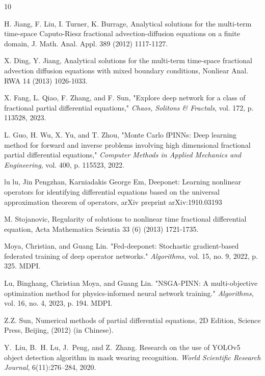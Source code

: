 \documentclass[11pt]{article}
\begin{document}
\begin{thebibliography}{10}
\begin{footnotesize}
 H. Jiang, F. Liu,  I. Turner,  K. Burrage,  Analytical solutions for the multi-term time-space
Caputo-Riesz fractional advection-diffusion equations on a finite domain, J. Math. Anal. Appl. 389 (2012) 1117-1127.

 X. Ding, Y. Jiang, Analytical solutions for the multi-term time-space fractional advection diffusion equations with mixed boundary conditions, Nonliear Anal. RWA 14 (2013) 1026-1033.

X. Fang, L. Qiao, F. Zhang, and F. Sun,  
"Explore deep network for a class of fractional partial differential equations,"  
\textit{Chaos, Solitons \& Fractals}, vol. 172, p. 113528, 2023.

L. Guo, H. Wu, X. Yu, and T. Zhou,  
"Monte Carlo fPINNs: Deep learning method for forward and inverse problems involving high dimensional fractional partial differential equations,"  
\textit{Computer Methods in Applied Mechanics and Engineering}, vol. 400, p. 115523, 2022.




 lu lu, Jin Pengzhan, Karniadakis George Em, Deeponet: Learning nonlinear operators for identifying differential equations based on the universal approximation theorem of operators, arXiv preprint arXiv:1910.03193

 M. Stojanovic,   Regularity of solutions to nonlinear time fractional differential equation, Acta Mathematica Scientia 33 (6) (2013) 1721-1735.



 Moya, Christian, and Guang Lin. "Fed-deeponet: Stochastic gradient-based federated training of deep operator networks." \textit{Algorithms}, vol. 15, no. 9, 2022, p. 325. MDPI.

 Lu, Binghang, Christian Moya, and Guang Lin. "NSGA-PINN: A multi-objective optimization method for physics-informed neural network training." \textit{Algorithms}, vol. 16, no. 4, 2023, p. 194. MDPI.




 Z.Z. Sun,   Numerical methods of partial differential equations, 2D Edition, Science Press, Beijing, (2012) (in Chinese).


Y.~Liu, B.~H. Lu, J.~Peng, and Z.~Zhang.
\newblock Research on the use of YOLOv5 object detection algorithm in mask wearing recognition.
\newblock \emph{World Scientific Research Journal}, 6(11):276--284, 2020.



\end{footnotesize}
\end{thebibliography}
\end{document}
